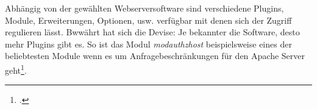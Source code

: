 Abhängig von der gewählten Webserversoftware sind verschiedene Plugins, Module,  Erweiterungen, Optionen, usw. verfügbar mit denen sich der Zugriff regulieren lässt. Bwwährt hat sich die Devise: Je bekannter die Software, desto  mehr Plugins gibt es.
So ist das Modul \emph{mod\textunderscore authz\textunderscore host} beispielsweise eines der beliebtesten Module wenn es um Anfragebeschränkungen für den Apache Server geht\footcite{apache-module-beschraenkung}.